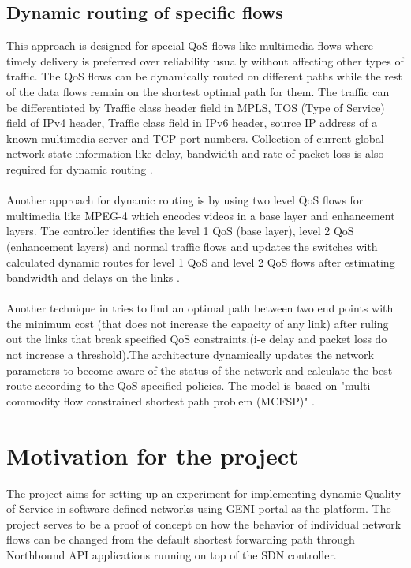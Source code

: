\documentclass[paper=a4, fontsize=12pt]{scrartcl}	%
\numberwithin{equation}{section}		%
\numberwithin{figure}{section}			%
\numberwithin{table}{section}				%
\begin{document}
\subsection{Dynamic routing of specific flows}
This approach is designed for special QoS flows like multimedia flows where timely delivery is preferred over reliability usually without affecting other types of traffic. The QoS flows can be dynamically routed on different paths while the rest of the data flows remain on the shortest optimal path for them. The traffic can be differentiated by Traffic class header field in MPLS, TOS (Type of Service) field of IPv4 header, Traffic class field in IPv6 header, source IP address of a known multimedia server and TCP port numbers. Collection of current global network state information like delay, bandwidth and rate of packet loss is also required for dynamic routing \cite{openqos}.
\\
\\
Another approach for dynamic routing is by using two level QoS flows for multimedia like MPEG-4 which encodes videos in a base layer and enhancement layers. The controller identifies the level 1 QoS (base layer), level 2 QoS (enhancement layers) and normal traffic flows and updates the switches with calculated dynamic routes for level 1 QoS and level 2 QoS flows after estimating bandwidth and delays on the links \cite{video}.
\\
\\
Another technique in \cite{thesis} tries to find an optimal path between two end points with the minimum cost (that does not increase the capacity of any link) after ruling out the links that break specified QoS constraints.(i-e delay and packet loss do not increase a threshold).The architecture dynamically updates the network parameters to become aware of the status of the network and calculate the best route according to the QoS specified policies. The model is based on "multi-commodity flow constrained shortest path problem (MCFSP)" .

\section{Motivation for the project}
The project aims for setting up an experiment for implementing dynamic Quality of Service in software defined networks using GENI portal as the platform. The project serves to be a proof of concept on how the behavior of individual network flows can be changed from the default shortest forwarding path through Northbound API applications running on top of the SDN controller.
\end{document}
